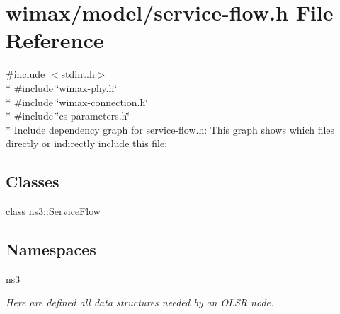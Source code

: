 \hypertarget{service-flow_8h}{}\section{wimax/model/service-\/flow.h File Reference}
\label{service-flow_8h}
{\ttfamily \#include $<$stdint.\+h$>$}\\*
{\ttfamily \#include \char`\"{}wimax-\/phy.\+h\char`\"{}}\\*
{\ttfamily \#include \char`\"{}wimax-\/connection.\+h\char`\"{}}\\*
{\ttfamily \#include \char`\"{}cs-\/parameters.\+h\char`\"{}}\\*
Include dependency graph for service-\/flow.h\+:
This graph shows which files directly or indirectly include this file\+:
\subsection*{Classes}
\begin{DoxyCompactItemize}
\item 
class \hyperlink{classns3_1_1ServiceFlow}{ns3\+::\+Service\+Flow}
\end{DoxyCompactItemize}
\subsection*{Namespaces}
\begin{DoxyCompactItemize}
\item 
 \hyperlink{namespacens3}{ns3}
\begin{DoxyCompactList}\small\item\em Here are defined all data structures needed by an O\+L\+SR node. \end{DoxyCompactList}\end{DoxyCompactItemize}
